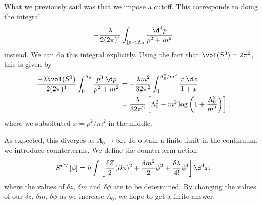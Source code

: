 \documentclass[a4paper]{article}
\begin{document}
What we previously said was that we impose a cutoff. This corresponds to doing the integral 
\[
  -\frac{\lambda}{2(2\pi)^4} \int_{|p| < \Lambda_0} \frac{\d^4 p}{p^2 + m^2}
\]
instead. We can do this integral explicitly.
%
%
%
%
%
Using the fact that $\vol(S^3) = 2\pi^2$, this is given by
\begin{align*}
  \frac{-\lambda \vol(S^3)}{2(2\pi)^4} \int_0^{\Lambda_0} \frac{p^3 \;\d p}{p^2 + m^2} &= -\frac{\lambda m^2}{32 \pi^2} \int_0^{\Lambda_0^2/m^2} \frac{x \;\d x}{1 + x} \\
  &= \frac{\lambda}{32 \pi^2} \left[\Lambda_0^2 - m^2 \log \left(1 + \frac{\Lambda_0^2}{m^2}\right)\right],
\end{align*}
where we substituted $x = p^2/m^2$ in the middle.

As expected, this diverges as $\Lambda_0 \to \infty$. To obtain a finite limit in the continuum, we introduce counterterms. We define the counterterm action
\[
  S^{CT}[\phi] = \hbar \int \left[\frac{\delta Z}{2} (\partial \phi)^2 + \frac{\delta m^2}{2} \phi^2 + \frac{\delta \lambda}{4!} \phi^4\right] \d^4 x,
\]
where the values of $\delta z$, $\delta m$ and $\delta \phi$ are to be determined. By changing the values of our $\delta z$, $\delta m$, $\delta\phi$ as we increase $\Lambda_0$, we hope to get a finite answer.
\end{document}

